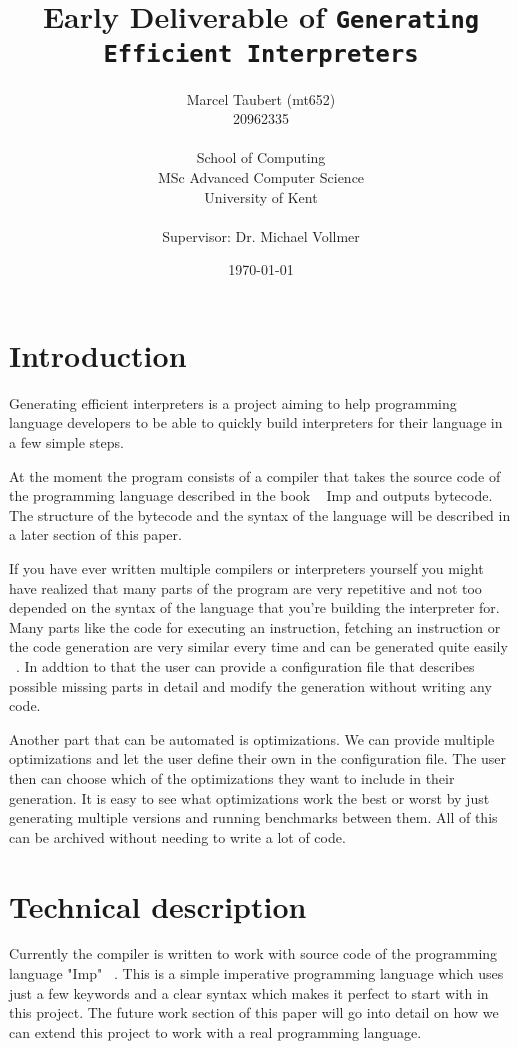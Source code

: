 \documentclass{article}
\title{Early Deliverable of \texttt{Generating Efficient Interpreters}}
\author{
    Marcel Taubert  (mt652)\\
    20962335        \\
    \\
    School of Computing \\
    MSc Advanced Computer Science\\
    University of Kent \\
    \\
    Supervisor: Dr. Michael Vollmer
}
\date{\today}
\begin{document}
\maketitle
\clearpage

\section{Introduction}
Generating efficient interpreters is a project aiming to help programming
language developers to be able to quickly build interpreters for their language
in a few simple steps.

At the moment the program consists of a compiler that takes the source code of
the programming language described in the book ~\cite{Pierce:SF1} Imp and
outputs bytecode. The structure of the bytecode and the syntax of the language
will be described in a later section of this paper.

If you have ever written multiple compilers or interpreters yourself you might
have realized that many parts of the program are very repetitive and not too
depended on the syntax of the language that you're building the interpreter
for. Many parts like the code for executing an instruction, fetching an
instruction or the code generation are very similar every time and can be
generated quite easily ~\cite{vmgen}. In addtion to that the user can provide a
configuration file that describes possible missing parts in detail and modify
the generation without writing any code.

Another part that can be automated is optimizations. We can provide multiple
optimizations and let the user define their own in the configuration file. The
user then can choose which of the optimizations they want to include in their
generation. It is easy to see what optimizations work the best or worst by just
generating multiple versions and running benchmarks between them. All of this
can be archived without needing to write a lot of code.

\section{Technical description} 
Currently the compiler is written to work with source code of the programming
language "Imp" ~\cite{Pierce:SF1}. This is a simple imperative programming
language which uses just a few keywords and a clear syntax which makes it
perfect to start with in this project. The future work section of this paper
will go into detail on how we can extend this project to work with a real
programming language.
\end{document}
